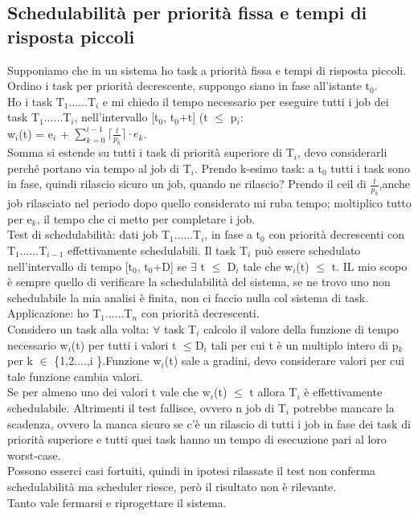 \documentclass[12pt, oneside]{extbook}
\begin{document}
\subsection{Schedulabilità per priorità fissa e tempi di risposta piccoli}Supponiamo che in un sistema ho task a priorità fissa e tempi di risposta piccoli.\\ Ordino i task per priorità decrescente, suppongo siano in fase all'istante t$_{0}$.\\ Ho i task T$_{1}$......T$_{i}$ e mi chiedo il tempo necessario per eseguire tutti i job dei task T$_{1}$......T$_{i}$, nell'intervallo [t$_{0}$, t$_{0}$+t] (t $\leq$ p$_{i}$:\\
w$_{i}$(t) = e$_{i}$ +  $\sum\limits_{k=0}^{i-1} \lceil\frac{t}{p_{k}}\rceil \cdot e_{k}$.\\ Somma si estende su tutti i task di priorità superiore di T$_{i}$, devo considerarli perché portano via tempo al job di T$_{i}$. Prendo k-esimo task: a t$_{0}$ tutti i task sono in fase, quindi rilascio sicuro un job, quando ne rilascio? Prendo il ceil di $\frac{t}{p_{k}}$,anche job rilasciato nel periodo dopo quello considerato mi ruba tempo; moltiplico tutto per e$_{k}$, il tempo che ci metto per completare i job.\\ Test di schedulabilità: dati job T$_{1}$......T$_{i}$, in fase a t$_{0}$ con priorità decrescenti con T$_{1}$......T$_{i-1}$ effettivamente schedulabili. Il task T$_{i}$ può essere schedulato nell'intervallo di tempo [t$_{0}$, t$_{0}$+D] se $\exists$ t $\leq$ D$_{i}$ tale che w$_{i}$(t) $\leq$ t. IL mio scopo è sempre quello di verificare la schedulabilità del sistema, se ne trovo uno non schedulabile la mia analisi è finita, non ci faccio nulla col sistema di task.\\ Applicazione: ho T$_{1}$......T$_{n}$ con priorità decrescenti. \\Considero un task alla volta: $\forall$ task T$_{i}$  calcolo il valore della funzione di tempo necessario w$_{i}$(t) per tutti i valori t $\leq$D$_{i}$ tali per cui t è un multiplo intero di p$_{k}$ per k $\in$ \{1,2....,i \}.Funzione w$_{i}$(t) sale a gradini, devo considerare valori per cui tale funzione cambia valori.\\ Se per almeno uno dei valori t vale che w$_{i}$(t) $\leq$ t allora T$_{i}$ è effettivamente schedulabile. Altrimenti il test fallisce, ovvero n job di T$_{i}$ potrebbe mancare la scadenza, ovvero la manca sicuro se c'è un rilascio di tutti i job in fase dei task di priorità superiore e tutti quei task hanno un tempo di esecuzione pari al loro worst-case.\\ Possono esserci casi fortuiti, quindi in ipotesi rilassate il test non conferma schedulabilità ma scheduler riesce, però il risultato non è rilevante.\\Tanto vale fermarsi e riprogettare il sistema.\\
\end{document}
